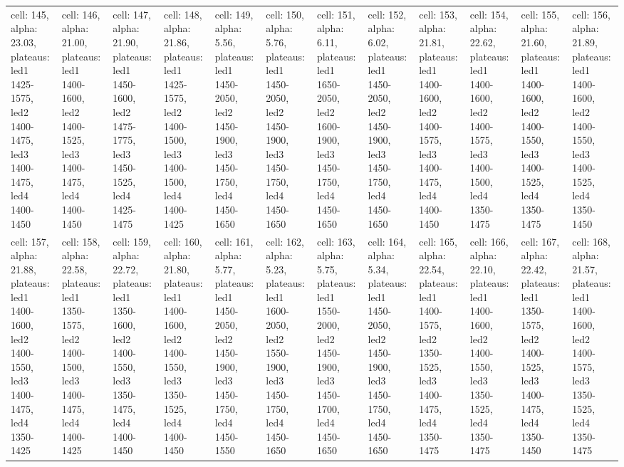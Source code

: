 \begin{landscape}
\begin{longtable}{|l|l|l|l|l|l|l|l|l|l|l|l|}
\rowcolor{lightgray} cell: 145, alpha: 23.03, plateaus: led1 1425-1575, led2 1400-1475, led3 1400-1475, led4 1400-1450 &cell: 146, alpha: 21.00, plateaus: led1 1400-1600, led2 1400-1525, led3 1400-1475, led4 1400-1450 &cell: 147, alpha: 21.90, plateaus: led1 1450-1600, led2 1475-1775, led3 1450-1525, led4 1425-1475 &cell: 148, alpha: 21.86, plateaus: led1 1425-1575, led2 1400-1500, led3 1400-1500, led4 1400-1425 &cell: 149, alpha: 5.56, plateaus: led1 1450-2050, led2 1450-1900, led3 1450-1750, led4 1450-1650 &cell: 150, alpha: 5.76, plateaus: led1 1450-2050, led2 1450-1900, led3 1450-1750, led4 1450-1650 &cell: 151, alpha: 6.11, plateaus: led1 1650-2050, led2 1600-1900, led3 1450-1750, led4 1450-1650 &cell: 152, alpha: 6.02, plateaus: led1 1450-2050, led2 1450-1900, led3 1450-1750, led4 1450-1650 &cell: 153, alpha: 21.81, plateaus: led1 1400-1600, led2 1400-1575, led3 1400-1475, led4 1400-1450 &cell: 154, alpha: 22.62, plateaus: led1 1400-1600, led2 1400-1575, led3 1400-1500, led4 1350-1475 &cell: 155, alpha: 21.60, plateaus: led1 1400-1600, led2 1400-1550, led3 1400-1525, led4 1350-1475 &cell: 156, alpha: 21.89, plateaus: led1 1400-1600, led2 1400-1550, led3 1400-1525, led4 1350-1450 \\
cell: 157, alpha: 21.88, plateaus: led1 1400-1600, led2 1400-1550, led3 1400-1475, led4 1350-1425 &cell: 158, alpha: 22.58, plateaus: led1 1350-1575, led2 1400-1500, led3 1400-1475, led4 1400-1425 &cell: 159, alpha: 22.72, plateaus: led1 1350-1600, led2 1400-1550, led3 1350-1475, led4 1400-1450 &cell: 160, alpha: 21.80, plateaus: led1 1400-1600, led2 1400-1550, led3 1350-1525, led4 1400-1450 &cell: 161, alpha: 5.77, plateaus: led1 1450-2050, led2 1450-1900, led3 1450-1750, led4 1450-1550 &cell: 162, alpha: 5.23, plateaus: led1 1600-2050, led2 1550-1900, led3 1450-1750, led4 1450-1650 &cell: 163, alpha: 5.75, plateaus: led1 1550-2000, led2 1450-1900, led3 1450-1700, led4 1450-1650 &cell: 164, alpha: 5.34, plateaus: led1 1450-2050, led2 1450-1900, led3 1450-1750, led4 1450-1650 &cell: 165, alpha: 22.54, plateaus: led1 1400-1575, led2 1350-1525, led3 1400-1475, led4 1350-1475 &cell: 166, alpha: 22.10, plateaus: led1 1400-1600, led2 1400-1550, led3 1350-1525, led4 1350-1475 &cell: 167, alpha: 22.42, plateaus: led1 1350-1575, led2 1400-1525, led3 1400-1475, led4 1350-1450 &cell: 168, alpha: 21.57, plateaus: led1 1400-1600, led2 1400-1575, led3 1350-1525, led4 1350-1475 \\

\end{longtable}
\end{landscape}
